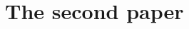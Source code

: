 \chapter{The second paper}
\label{ch:second_paper}


\begingroup
\endgroup


\chapabstract{
    \lipsum[1]
}

\lipsum[1-5]
